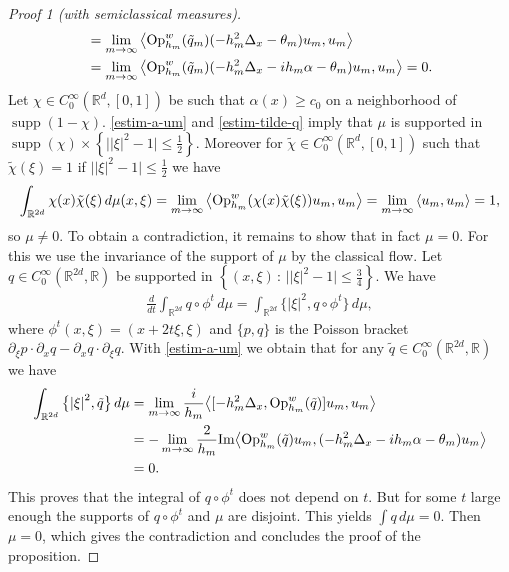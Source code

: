 \documentclass[10pt, a4paper,reqno]{amsart}
\theoremstyle{plain}
\theoremstyle{definition}
\theoremstyle{remark}
\begin{document}
\begin{proof}[Proof 1 (with semiclassical measures)]
\begin{align}
& = \lim_{m \to \infty} {\left< {{{\mathop{\rm{Op}}}_{h_m}^w}(\tilde q_m) (-h_m^2 {\Delta}_x -{\theta}_m) u_m} , {u_m} \right>}\\
\nonumber
& = \lim_{m \to \infty} {\left< {{{\mathop{\rm{Op}}}_{h_m}^w}(\tilde q_m) (-h_m^2 {\Delta}_x -ih_m {\alpha} - {\theta}_m) u_m} , {u_m} \right>} = 0.
\end{align}
Let ${\chi} \in C_0^\infty({\mathbb{R}}^d,[0,1])$ be such that ${\alpha}(x) {\geqslant} c_0$ on a neighborhood of $\operatorname{supp}(1-{\chi})$. \eqref{estim-a-um} and \eqref{estim-tilde-q} imply that ${\mu}$ is supported in $\operatorname{supp}({\chi}) \times {\left\{ {\big| {\left\vert {\xi}\right\vert}^2 -1 \big| {\leqslant} \frac 12} \right\}}$. Moreover for $\tilde {\chi} \in C_0^\infty({\mathbb{R}}^d,[0,1])$ such that $\tilde {\chi}({\xi}) = 1$ if $\big| {\left\vert {\xi}\right\vert}^2-1 \big| {\leqslant} \frac 12$ we have 
\[
\int_{{\mathbb{R}}^{2d}} {\chi}(x) \tilde {\chi} ({\xi}) \, d{\mu} (x,{\xi}) = \lim_{m \to \infty} {\left< {{{\mathop{\rm{Op}}}_{h_m}^w}({\chi}(x) \tilde {\chi}({\xi})) u_m} , {u_m} \right>} = \lim_{m \to \infty} {\left< {u_m} , {u_m} \right>} = 1,
\]
so ${\mu} \neq 0$. To obtain a contradiction, it remains to show that in fact ${\mu} = 0$. For this we use the invariance of the support of ${\mu}$ by the classical flow. Let $q \in C_0^\infty({\mathbb{R}}^{2d},{\mathbb{R}})$ be supported in ${\left\{ {(x,{\xi}) {\,:\,} \big| {\left\vert {\xi}\right\vert}^2 - 1 \big| {\leqslant} \frac 34} \right\}}$. We have 
\begin{align*}
\frac d {dt} \int_{{\mathbb{R}}^{2d}} q \circ {\phi}^t \, d{\mu} = \int_{{\mathbb{R}}^{2d}} \big\{{\left\vert {\xi}\right\vert}^2 , q \circ {\phi}^t \big\}  \, d{\mu},
\end{align*}
where ${\phi}^t (x,{\xi}) = (x+2t{\xi},{\xi})$ and $\{p,q\}$ is the Poisson bracket $\partial_{\xi} p \cdot \partial_x q - \partial_x q \cdot \partial_{\xi} q$. With \eqref{estim-a-um} we obtain that for any $\tilde q \in C_0^\infty({\mathbb{R}}^{2d},{\mathbb{R}})$ we have 
\begin{align*}
\int_{{\mathbb{R}}^{2d}} \big\{ {\left\vert {\xi}\right\vert}^2 , \tilde q \big\}  \, d{\mu}
& = \lim_{m \to \infty} \frac i {h_m} {\left< {[-h_m^2 {{\Delta}_x} , {{\mathop{\rm{Op}}}_{h_m}^w}(\tilde q)] u_m} , {u_m} \right>}\\
& = - \lim_{m \to \infty} \frac 2 {h_m} {\mathop{\rm{Im}}\nolimits} {\left< {{{\mathop{\rm{Op}}}_{h_m}^w}(\tilde q) u_m} , {(-h_m^2 {{\Delta}_x} - i h_m {\alpha} - {\theta}_m)u_m} \right>}\\
& = 0.
\end{align*}
This proves that the integral of $q \circ {\phi}^t$ does not depend on $t$. But for some $t$ large enough the supports of $q \circ {\phi}^t$ and ${\mu}$ are disjoint. This yields $\int q \, d{\mu} = 0$. Then ${\mu} = 0$, which gives the contradiction and concludes the proof of the proposition.
\end{proof}
\end{document}
